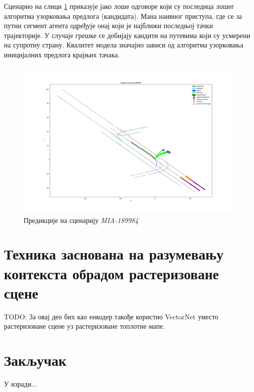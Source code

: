 \documentclass[11pt,oneside]{memoir}
\begin{document}
Сценарио на слици \ref{tnt-MIA-189984} приказује јако лоше одговоре који су последица лошег алгоритма узорковања предлога (кандидата). Мана
наивног приступа, где се за путни сегмент агента одређује онај који је најближи последњој тачки трајекторије. У случаје грешке се добијају
кандити на путевима који су усмерени на супротну страну. Квалитет модела значајно зависи од алгоритма узорковања иницијалних предлога 
крајњих тачака.

\begin{figure}[H]
  \centering
  \includegraphics[width=1.0\textwidth]{images/MIA_189984.png}
  \caption{Предикције на сценарију \textit{MIA-189984} \label{tnt-MIA-189984}}
\end{figure}

\chapter{Техника заснована на разумевању контекста обрадом растеризоване сцене}
\label{chp:razrada}

TODO: За овај део бих као енкодер такође користио VectorNet уместо растеризоване сцене уз растеризоване топлотне мапе. 

\chapter{Закључак}
У изради...
\end{document}
